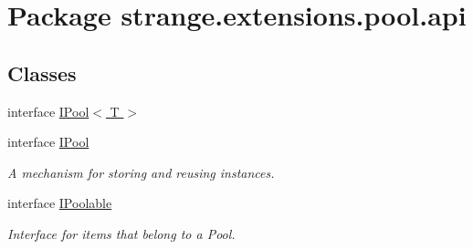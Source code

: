 \hypertarget{namespacestrange_1_1extensions_1_1pool_1_1api}{\section{Package strange.\-extensions.\-pool.\-api}
\label{namespacestrange_1_1extensions_1_1pool_1_1api}
}
\subsection*{Classes}
\begin{DoxyCompactItemize}
\item 
interface \hyperlink{interfacestrange_1_1extensions_1_1pool_1_1api_1_1_i_pool_3_01_t_01_4}{I\-Pool$<$ T $>$}
\item 
interface \hyperlink{interfacestrange_1_1extensions_1_1pool_1_1api_1_1_i_pool}{I\-Pool}
\begin{DoxyCompactList}\small\item\em A mechanism for storing and reusing instances. \end{DoxyCompactList}\item 
interface \hyperlink{interfacestrange_1_1extensions_1_1pool_1_1api_1_1_i_poolable}{I\-Poolable}
\begin{DoxyCompactList}\small\item\em Interface for items that belong to a Pool. \end{DoxyCompactList}\end{DoxyCompactItemize}
